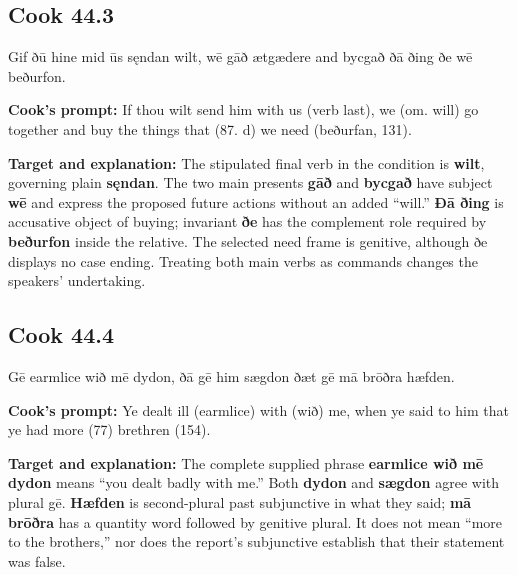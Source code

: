 \par\begin{minipage}{\linewidth}\raggedright
\subsection*{Cook 44.3}

Gif ðū hine mid ūs sęndan wilt, wē gāð ætgædere and bycgað ðā ðing ðe wē beðurfon.

\textbf{Cook’s prompt:} If thou wilt send him with us (verb last), we (om. will) go together and buy the things that (87. d) we need (beðurfan, 131).

\textbf{Target and explanation:} The stipulated final verb in the condition is \textbf{wilt}, governing plain \textbf{sęndan}. The two main presents \textbf{gāð} and \textbf{bycgað} have subject \textbf{wē} and express the proposed future actions without an added “will.” \textbf{Ðā ðing} is accusative object of buying; invariant \textbf{ðe} has the complement role required by \textbf{beðurfon} inside the relative. The selected need frame is genitive, although ðe displays no case ending. Treating both main verbs as commands changes the speakers’ undertaking.

\end{minipage}\par\addvspace{4pt}

\par\begin{minipage}{\linewidth}\raggedright
\subsection*{Cook 44.4}

Gē earmlice wið mē dydon, ðā gē him sægdon ðæt gē mā brōðra hæfden.

\textbf{Cook’s prompt:} Ye dealt ill (earmlice) with (wið) me, when ye said to him that ye had more (77) brethren (154).

\textbf{Target and explanation:} The complete supplied phrase \textbf{earmlice wið mē dydon} means “you dealt badly with me.” Both \textbf{dydon} and \textbf{sægdon} agree with plural gē. \textbf{Hæfden} is second-plural past subjunctive in what they said; \textbf{mā brōðra} has a quantity word followed by genitive plural. It does not mean “more to the brothers,” nor does the report’s subjunctive establish that their statement was false.

\end{minipage}\par\addvspace{4pt}

